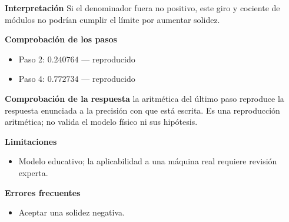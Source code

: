 \documentclass[10pt,openany]{book}
\begin{document}
\begin{tcolorbox}[title={Problema resuelto 2}, studiumworked, breakable]
\noindent\textbf{Interpretación}
Si el denominador fuera no positivo, este giro y cociente de módulos no podrían cumplir el límite por aumentar solidez.

\noindent\textbf{Comprobación de los pasos}
\begin{itemize}
\item Paso 2: $0.240764$ — reproducido
\item Paso 4: $0.772734$ — reproducido
\end{itemize}

\noindent\textbf{Comprobación de la respuesta} la aritmética del último paso reproduce la respuesta enunciada a la precisión con que está escrita. Es una reproducción aritmética; no valida el modelo físico ni sus hipótesis.

\noindent\textbf{Limitaciones}
\begin{itemize}
\item Modelo educativo; la aplicabilidad a una máquina real requiere revisión experta.
\end{itemize}

\noindent\textbf{Errores frecuentes}
\begin{itemize}
\item Aceptar una solidez negativa.
\end{itemize}
\end{tcolorbox}
\end{document}
